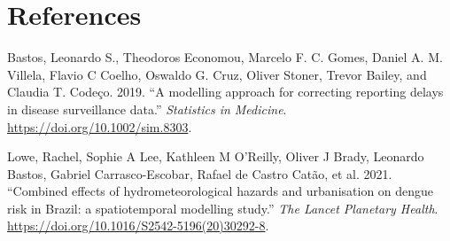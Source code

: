\documentclass[
  letterpaper,
  DIV=11,
  numbers=noendperiod]{scrreprt}
\newlength{\cslhangindent}
\newlength{\cslentryspacingunit} %
\newenvironment{CSLReferences}[2] %
 {%
  \setlength{\parindent}{0pt}
  \ifodd #1
  \let\oldpar\par
  \def\par{\hangindent=\cslhangindent\oldpar}
  \fi
  \setlength{\parskip}{#2\cslentryspacingunit}
 }%
 {}
\begin{document}

\hypertarget{references}{%
\chapter*{References}\label{references}}


\hypertarget{refs}{}
\begin{CSLReferences}{1}{0}
\leavevmode{}%
Bastos, Leonardo S., Theodoros Economou, Marcelo F. C. Gomes, Daniel A.
M. Villela, Flavio C Coelho, Oswaldo G. Cruz, Oliver Stoner, Trevor
Bailey, and Claudia T. Codeço. 2019. {``{A modelling approach for
correcting reporting delays in disease surveillance data}.''}
\emph{{Statistics in Medicine}}. \url{https://doi.org/10.1002/sim.8303}.

\leavevmode{}%
Lowe, Rachel, Sophie A Lee, Kathleen M O'Reilly, Oliver J Brady,
Leonardo Bastos, Gabriel Carrasco-Escobar, Rafael de Castro Catão, et
al. 2021. {``{Combined effects of hydrometeorological hazards and
urbanisation on dengue risk in Brazil: a spatiotemporal modelling
study}.''} \emph{{The Lancet Planetary Health}}.
\url{https://doi.org/10.1016/S2542-5196(20)30292-8}.

\end{CSLReferences}
\end{document}
